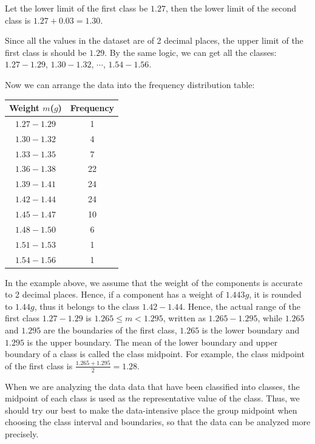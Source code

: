 \documentclass{report}
\begin{document}
\begin{multicols}{2}
  Let the lower limit of the first class be $1.27$, then the lower limit of the
  second class is $1.27 + 0.03 = 1.30$.

  Since all the values in the dataset are of 2 decimal places, the upper limit of
  the first class is should be $1.29$. By the same logic, we can get all the
  classes: $1.27 - 1.29$, $1.30 - 1.32$, $\cdots$, $1.54 - 1.56$.

  Now we can arrange the data into the frequency distribution table:

  \begin{center}
    \begin{tabular}{|c|c|}
      \hline
      Weight $m$($g$) & Frequency \\
      \hline
      $1.27 - 1.29$   & 1         \\
      $1.30 - 1.32$   & 4         \\
      $1.33 - 1.35$   & 7         \\
      $1.36 - 1.38$   & 22        \\
      $1.39 - 1.41$   & 24        \\
      $1.42 - 1.44$   & 24        \\
      $1.45 - 1.47$   & 10        \\
      $1.48 - 1.50$   & 6         \\
      $1.51 - 1.53$   & 1         \\
      $1.54 - 1.56$   & 1         \\
      \hline
    \end{tabular}
  \end{center}

  In the example above, we assume that the weight of the components is accurate
  to 2 decimal places. Hence, if a component has a weight of $1.443g$, it is
  rounded to $1.44g$, thus it belongs to the class $1.42 - 1.44$. Hence, the
  actual range of the first class $1.27 - 1.29$ is $1.265 \leq m < 1.295$,
  written as $1.265 - 1.295$, while $1.265$ and $1.295$ are the boundaries of the
  first class, $1.265$ is the lower boundary and $1.295$ is the upper boundary.
  The mean of the lower boundary and upper boundary of a class is called the
  class midpoint. For example, the class midpoint of the first class is
  $\frac{1.265 + 1.295}{2} = 1.28$.

  When we are analyzing the data data that have been classified into classes, the
  midpoint of each class is used as the representative value of the class. Thus,
  we should try our best to make the data-intensive place the group midpoint when
  choosing the class interval and boundaries, so that the data can be analyzed
  more precisely.


\end{multicols}
\end{document}
